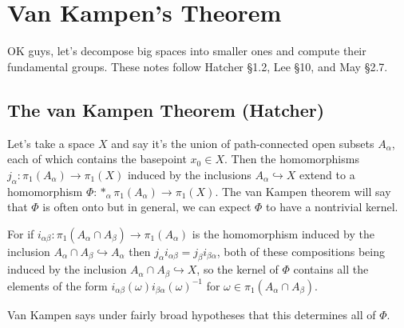 \section{Van Kampen's Theorem}
OK guys, let's decompose big spaces into smaller ones and compute their fundamental groups. These notes follow Hatcher \S 1.2, Lee \S 10, and May \S 2.7.
\subsection{The van Kampen Theorem (Hatcher)}
Let's take a space $X$ and say it's the union of path-connected open subsets $A_{\alpha}$, each of which contains the basepoint $x_0\in X$. Then the homomorphisms $j_{\alpha} \colon \pi_1(A_{\alpha}) \to \pi_1(X)$ induced by the inclusions $A_{\alpha}\hookrightarrow X$ extend to a homomorphism $\Phi \colon *_{\alpha}\pi_1(A_{\alpha}) \to \pi_1(X)$. The van Kampen theorem will say that $\Phi$ is often onto but in general, we can expect $\Phi$ to have a nontrivial kernel. 

For if $i_{\alpha\beta} \colon  \pi_1(A_{\alpha}\cap A_{\beta}) \to \pi_1(A_{\alpha})$ is the homomorphism induced by the inclusion $A_{\alpha}\cap A_{\beta}\hookrightarrow A_{\alpha}$ then $j_{\alpha}i_{\alpha\beta}=j_{\beta}i_{\beta\alpha}$, both of these compositions being induced by the inclusion $A_{\alpha}\cap A_{\beta}\hookrightarrow X$, so the kernel of $\Phi$ contains all the elements of the form $i_{\alpha\beta}(\omega)i_{\beta\alpha}(\omega)^{-1}$ for $\omega \in \pi_1(A_{\alpha}\cap A_{\beta})$. 

Van Kampen says under fairly broad hypotheses that this determines all of $\Phi$.


